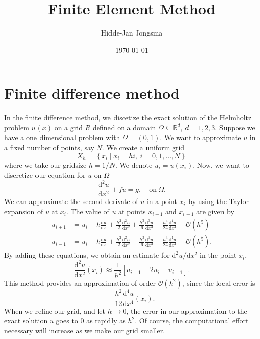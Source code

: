 \documentclass[a4paper]{article}
\author{Hidde-Jan Jongsma}
\title{Finite Element Method}
\date{\today}
\newcommand{\Reals}{\mathbb{R}}
\newcommand{\dd}{\mathrm{d}}
\begin{document}
\section{Finite difference method}

In the finite difference method, we discetize the exact solution of
the Helmholtz problem $u(x)$ on a grid $R$ defined on a domain $\Omega
\subseteq \Reals^d$, $d = 1, 2, 3$. Suppose we have a one dimensional
problem with $\Omega = (0, 1)$. We want to approximate $u$ in a fixed
number of points, say $N$. We create a uniform grid
\begin{equation}
  X_h = \left\{ x_i\ |\ x_i = h i,\ i = 0, 1, \ldots, N \right\}
\end{equation}
where we take our gridsize $h = 1/N$. We denote $u_i = u(x_i)$. Now,
we want to discretize our equation for $u$ on $\Omega$
\begin{equation}
  \frac{\dd^2 u}{\dd x^2} + f u = g, \quad \text{on}\ \Omega.
\end{equation}
We can approximate the second derivate of $u$ in a point $x_i$ by
using the Taylor expansion of $u$ at $x_i$. The value of $u$ at points
$x_{i + 1}$ and $x_{i - 1}$ are given by
\begin{align}
  u_{i + 1} & = u_{i} + h \frac{\dd u}{\dd x}
    + \frac{h^2}{2} \frac{\dd^2 u}{\dd x^2}
    + \frac{h^3}{6} \frac{\dd^3 u}{\dd x^3}
    + \frac{h^4}{24} \frac{\dd^4 u}{\dd x^4} 
    + \mathcal{O}(h^5) \\
%
  u_{i - 1} & = u_{i} - h \frac{\dd u}{\dd x}
    + \frac{h^2}{2} \frac{\dd^2 u}{\dd x^2}
    - \frac{h^3}{6} \frac{\dd^3 u}{\dd x^3}
    + \frac{h^4}{24} \frac{\dd^4 u}{\dd x^4}
    + \mathcal{O}(h^5).
\end{align}
By adding these equations, we obtain an estimate for $\dd^2 u / \dd
x^2$ in the point $x_i$,
\begin{equation}
  \frac{\dd^2 u}{\dd x^2}(x_i)
  \approx
    \frac{1}{h^2} \left[ u_{i + 1} - 2 u_i + u_{i - 1} \right].
\end{equation}
This method provides an approximation of order $\mathcal{O}(h^2)$,
since the local error is
\begin{equation*}
  - \frac{h^2}{12} \frac{\dd^4 u}{\dd x^4}(x_i).
\end{equation*}
When we refine our grid, and let $h \rightarrow 0$, the error in our
approximation to the exact solution $u$ goes to $0$ as rapidly as
$h^2$. Of course, the computational effort necessary will increase as
we make our grid smaller.
\end{document}
